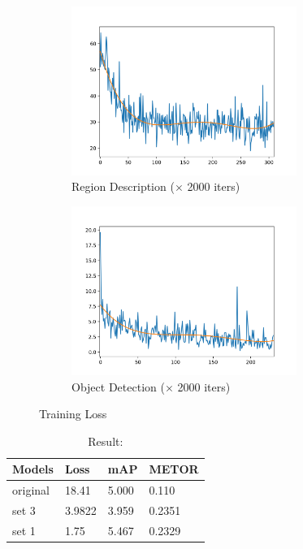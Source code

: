 \documentclass[12pt,a4paper]{report}
\begin{document}
\begin{figure}[h]
\begin{subfigure}{0.5\linewidth}
	\includegraphics[height=5.5cm,width=\textwidth]{origin_loss.png}
	\caption{Region Description ($\times$ 2000 iters)}
\end{subfigure}
\begin{subfigure}{0.5\linewidth}
	\includegraphics[height=5.5cm,width=\textwidth]{new_loss.png}
	\caption{Object Detection ($\times$ 2000 iters)}
\end{subfigure}
\label{dataset example}
\caption{Training Loss }
\end{figure}

\begin{table}[]
\centering
\caption{Result:}
\label{my-label}
\begin{tabular}{|l|l|l|l|}
\hline
Models   & Loss   & mAP   & METOR  \\ \hline
original & 18.41  & 5.000 & 0.110  \\ \hline
set 3    & 3.9822 & 3.959 & 0.2351 \\ \hline
set 1    & 1.75   & 5.467 & 0.2329 \\ \hline
\end{tabular}
\end{table}
\newpage
\end{document}
